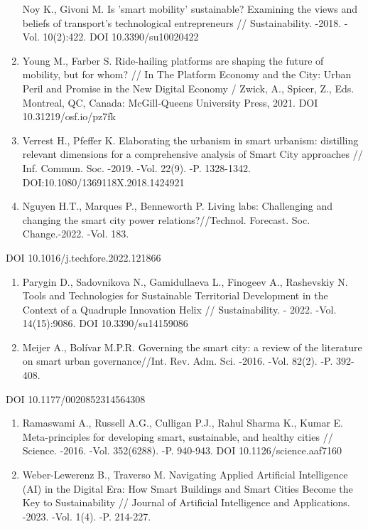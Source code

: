 \begin{enumerate}
  Noy K., Givoni M. Is 'smart mobility' sustainable? Examining the views
  and beliefs of transport's technological entrepreneurs //
  Sustainability. -2018. -Vol. 10(2):422. DOI 10.3390/su10020422
\item
  Young M., Farber S. Ride-hailing platforms are shaping the future of
  mobility, but for whom? // In The Platform Economy and the City: Urban
  Peril and Promise in the New Digital Economy / Zwick, A., Spicer, Z.,
  Eds. Montreal, QC, Canada: McGill-Queens University Press, 2021. DOI
  10.31219/osf.io/pz7fk
\item
  Verrest H., Pfeffer K. Elaborating the urbanism in smart urbanism:
  distilling relevant dimensions for a comprehensive analysis of Smart
  City approaches // Inf. Commun. Soc. -2019. -Vol. 22(9). -P.
  1328-1342. DOI:10.1080/1369118X.2018.1424921
\item
  Nguyen H.T., Marques P., Benneworth P. Living labs: Challenging and
  changing the smart city power relations?//Technol. Forecast. Soc.
  Change.-2022. -Vol. 183.
\end{enumerate}

DOI 10.1016/j.techfore.2022.121866

\begin{enumerate}
\def\labelenumi{\arabic{enumi}.}
\setcounter{enumi}{12}
\item
  Parygin D., Sadovnikova N., Gamidullaeva L., Finogeev A., Rashevskiy
  N. Tools and Technologies for Sustainable Territorial Development in
  the Context of a Quadruple Innovation Helix // Sustainability. - 2022.
  -Vol. 14(15):9086. DOI 10.3390/su14159086
\item
  Meijer A., Bolívar M.P.R. Governing the smart city: a review of the
  literature on smart urban governance//Int. Rev. Adm. Sci. -2016. -Vol.
  82(2). -P. 392-408.
\end{enumerate}

DOI 10.1177/0020852314564308

\begin{enumerate}
\def\labelenumi{\arabic{enumi}.}
\setcounter{enumi}{14}
\item
  Ramaswami A., Russell A.G., Culligan P.J., Rahul Sharma K., Kumar E.
  Meta-principles for developing smart, sustainable, and healthy cities
  // Science. -2016. -Vol. 352(6288). -P. 940-943. DOI
  10.1126/science.aaf7160
\item
  Weber-Lewerenz B., Traverso M. Navigating Applied Artificial
  Intelligence (AI) in the Digital Era: How Smart Buildings and Smart
  Cities Become the Key to Sustainability // Journal of Artificial
  Intelligence and Applications. -2023. -Vol. 1(4). -P. 214-227.
\end{enumerate}


